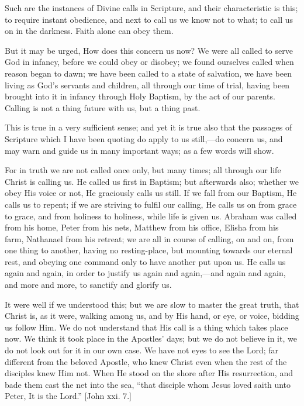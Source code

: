 Such are the instances of Divine calls in Scripture, and their
characteristic is this; to require instant obedience, and next to call
us we know not to what; to call us on in the darkness. Faith alone can
obey them.

But it may be urged, How does this concern us now? We were all
called to serve God in infancy, before we could obey or disobey; we
found ourselves called when reason began to dawn; we have been called
to a state of salvation, we have been living as God's servants and
children, all through our time of trial, having been brought into it
in infancy through Holy Baptism, by the act of our parents. Calling is
not a thing future with us, but a thing past.

This is true in a very sufficient sense; and yet it is true also
that the passages of Scripture which I have been quoting do apply to
us still,—do concern us, and may warn and guide us in many important
ways; as a few words will show.

For in truth we are not called once only, but many times; all
through our life Christ is calling us. He called us first in Baptism;
but afterwards also; whether we obey His voice or not, He graciously
calls us still. If we fall from our Baptism, He calls us to repent; if
we are striving to fulfil our calling, He calls us on from grace to
grace, and from holiness to holiness, while life is given us. Abraham
was called from his home, Peter from his nets, Matthew from his
office, Elisha from his farm, Nathanael from his retreat; we are all
in course of calling, on and on, from one thing to another, having no
resting-place, but mounting towards our eternal rest, and obeying one
command only to have another put upon us. He calls us again and again,
in order to justify us again and again,—and again and again, and
more and more, to sanctify and glorify us.

It were well if we understood this; but we are slow to master the
great truth, that Christ is, as it were, walking among us, and by His
hand, or eye, or voice, bidding us follow Him. We do not understand
that His call is a thing which takes place now. We think it took place
in the Apostles' days; but we do not believe in it, we do not look out
for it in our own case. We have not eyes to see the Lord; far
different from the beloved Apostle, who knew Christ even when the rest
of the disciples knew Him not. When He stood on the shore after His
resurrection, and bade them cast the net into the sea, ``that
disciple whom Jesus loved saith unto Peter, It is the Lord.''
[John xxi. 7.]

